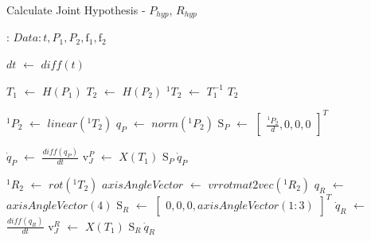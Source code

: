 \documentclass[12pt,a4paper]{report}
\begin{document}
\begin{algorithm}[H]
    \caption{Calculate Joint Hypothesis - $P_{hyp}$, $R_{hyp}$}
    \label{alg:joint estimation}
    \begin{algorithmic}[1]
        \REQUIRE: $Data : t, \textit{P}_1, \textit{P}_2, \mathrm{f}_1,\mathrm{f}_2$ 
  
        
           \STATE $dt$ $\leftarrow$ $diff(t)$
           
             
             \STATE $T_1$ $\leftarrow$ $H(P_1)$
             \STATE $T_2$ $\leftarrow$ $H(P_2)$
             \STATE $^1T_2$ $\leftarrow$ $T_1^{-1}$ $T_2$ \hspace*{3.3cm} 
            
             \STATE $^1P_2$ $\leftarrow$ $linear(^1T_2)$
             \STATE $q_P$ $\leftarrow$ $norm(^1P_2)$
             \STATE $\mathrm{S}_P$ $\leftarrow$ $\begin{bmatrix}
                                                   \frac{^1P_2}{d},0,0,0
                                                \end{bmatrix}^T$
                                                
             \STATE $\dot{q}_P$ $\leftarrow$ $\frac{diff(q_P)}{dt}$ \hspace*{4.5cm} 
             \STATE $\mathrm{v}_J^P$ $\leftarrow$ $X(T_1)$ $\mathrm{S}_P \ \dot{q}_P$ \hspace*{3.4cm}\hspace{-3.2cm}
             
             \STATE $^1{R}_2$ $\leftarrow$ $rot(^1T_2)$
             \STATE $axisAngleVector$ $\leftarrow$ $vrrotmat2vec(^1R_2)$
             \STATE $q_R$ $\leftarrow$ $axisAngleVector(4)$
             \STATE $\mathrm{S}_R$ $\leftarrow$ $\begin{bmatrix}
                                                  0,0,0,axisAngleVector(1:3)
                                                \end{bmatrix}^T$
             \STATE $\dot{q}_R$ $\leftarrow$ $\frac{diff(q_R)}{dt}$   
             \STATE $\mathrm{v}_J^R$ $\leftarrow$ $X(T_1)$ $\mathrm{S}_R \ \dot{q}_R$
             

\end{algorithmic}
\end{algorithm}
\end{document}
